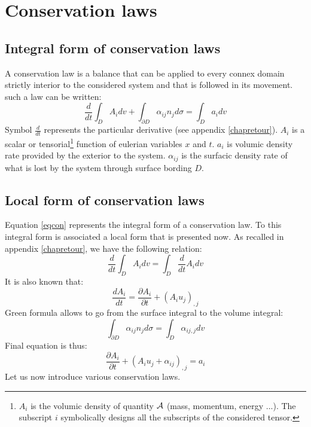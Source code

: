 \documentclass[12pt]{book}
\begin{document}
\section{Conservation laws}
\subsection{Integral form of conservation laws}
A conservation law
is a balance that can be
applied to every connex domain strictly interior to the considered system and
that is followed in its movement. such a law can be written:
\begin{equation}
\frac{d}{dt}\int_D A_idv+\int_{\partial D} \alpha_{ij}
n_jd\sigma=\int_D a_idv \label{eqcon}
\end{equation}
Symbol $\frac{d}{dt}$ represents the particular derivative (see appendix
\ref{chapretour}). 
$A_i$ is a scalar or tensorial\footnote{%
$A_i$
is the volumic density of quantity ${\cal
A}$ (mass, momentum, energy ...). The subscript $i$ symbolically designs all
the subscripts of the considered tensor.
}%
 function of eulerian variables $x$ and $t$.  $a_i$ is volumic density rate
 provided by the exterior to the system. $\alpha_{ij}$ is the surfacic density
 rate of what is lost by the system through surface bording $D$.
\subsection{Local form of conservation laws}
Equation \ref{eqcon} represents the integral form of a conservation law. To
this integral form is associated a local form that is presented now. As
recalled in appendix \ref{chapretour}, we have the following relation:
\begin{equation}
\frac{d}{dt}\int_D A_idv=\int_D \frac{d}{dt} A_idv
\end{equation}
It is also known that:
\begin{equation}
\frac{dA_i}{dt}=\frac{\partial A_i}{\partial t}+(A_iu_j)_{,j}
\end{equation}
Green formula allows to go from the surface integral to the volume
integral:
\begin{equation}
\int_{\partial D} \alpha_{ij}n_jd\sigma=\int_{D} \alpha_{ij,j}dv
\end{equation}
Final equation is thus:
\begin{equation}
\frac{\partial A_i}{\partial t}+(A_iu_j+\alpha_{ij})_{,j}=a_i
\end{equation}
Let us now introduce various conservation laws. 
\end{document}

